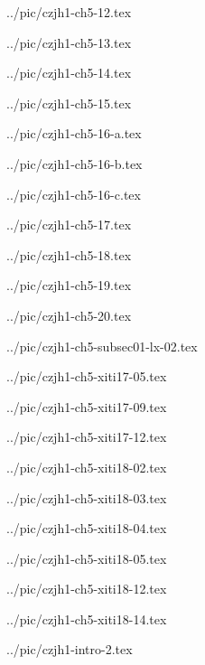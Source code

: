 ../pic/czjh1-ch5-12.tex



../pic/czjh1-ch5-13.tex



../pic/czjh1-ch5-14.tex



../pic/czjh1-ch5-15.tex



../pic/czjh1-ch5-16-a.tex



../pic/czjh1-ch5-16-b.tex



../pic/czjh1-ch5-16-c.tex



../pic/czjh1-ch5-17.tex



../pic/czjh1-ch5-18.tex



../pic/czjh1-ch5-19.tex



../pic/czjh1-ch5-20.tex



../pic/czjh1-ch5-subsec01-lx-02.tex



../pic/czjh1-ch5-xiti17-05.tex



../pic/czjh1-ch5-xiti17-09.tex



../pic/czjh1-ch5-xiti17-12.tex



../pic/czjh1-ch5-xiti18-02.tex



../pic/czjh1-ch5-xiti18-03.tex



../pic/czjh1-ch5-xiti18-04.tex



../pic/czjh1-ch5-xiti18-05.tex



../pic/czjh1-ch5-xiti18-12.tex



../pic/czjh1-ch5-xiti18-14.tex



../pic/czjh1-intro-2.tex

